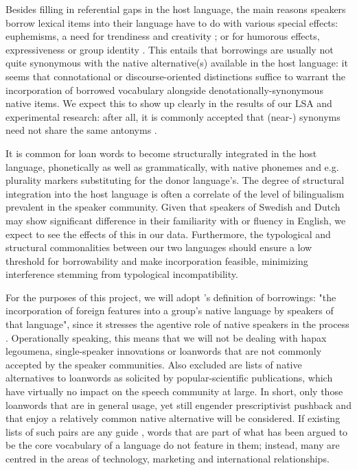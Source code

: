 \documentclass[a4paper]{article}
\begin{document}
Besides filling in referential gaps in the host language, the main reasons speakers borrow lexical items into their language have to do with various special effects: euphemisms, a need for trendiness and creativity \citep[cf.][]{Rebuck2002}; or for humorous effects, expressiveness or group identity \citep[cf.][]{Gottlieb2006,Wennberg2010}. 
This entails that borrowings are usually not quite synonymous with the native alternative(s) available in the host language: it seems that connotational or discourse-oriented distinctions suffice to warrant the incorporation of borrowed vocabulary alongside denotationally-synonymous native items. 
We expect this to show up clearly in the results of our LSA and experimental research: after all, it is commonly accepted that (near-) synonyms need not share the same antonyms \citep[cf.][]{Miller1990}. 

It is common for loan words to become structurally integrated in the host language, phonetically as well as grammatically, with native phonemes and e.g. plurality markers substituting for the donor language's.
The degree of structural integration into the host language is often a correlate of the level of bilingualism prevalent in the speaker community.
Given that speakers of Swedish and Dutch may show significant difference in their familiarity with or fluency in English, we expect to see the effects of this in our data.
Furthermore, the typological and structural commonalities between our two languages should ensure a low threshold for borrowability and make incorporation feasible, minimizing interference stemming from typological incompatibility.

For the purposes of this project, we will adopt \citet[p.37]{Thomason1988}'s definition of borrowings: "the incorporation of foreign features into a group's native language by speakers of that language", since it stresses the agentive role of native speakers in the process \citep[see also][p.12]{Winford2003}. 
Operationally speaking, this means that we will not be dealing with hapax legoumena, single-speaker innovations or loanwords that are not commonly accepted by the speaker communities. 
Also excluded are lists of native alternatives to loanwords as solicited by popular-scientific publications, which have virtually no impact on the speech community at large. 
In short, only those loanwords that are in general usage, yet still engender prescriptivist pushback and that enjoy a relatively common native alternative will be considered. 
If existing lists of such pairs are any guide \citep[cf.][]{Koops2009,Universitet2012}, words that are part of what has been argued to be the core vocabulary of a language \citep[see][]{Swadesh1952} do not feature in them; instead, many are centred in the areas of technology, marketing and international relationships. 
\end{document}
